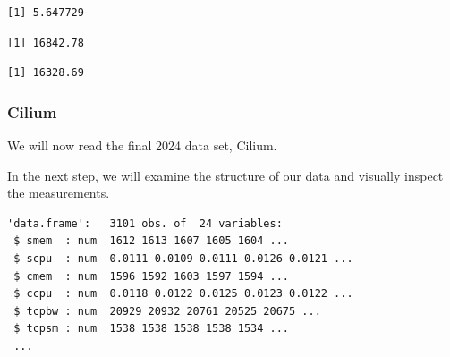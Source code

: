 \begin{verbatim}
[1] 5.647729
\end{verbatim}

\begin{Shaded}
\begin{Highlighting}[]
\SpecialCharTok{\$}
\end{Highlighting}
\end{Shaded}

\begin{verbatim}
[1] 16842.78
\end{verbatim}

\begin{Shaded}
\begin{Highlighting}[]
\SpecialCharTok{\$}
\end{Highlighting}
\end{Shaded}

\begin{verbatim}
[1] 16328.69
\end{verbatim}

\subsubsection{Cilium}

We will now read the final 2024 data set, Cilium.

\begin{Shaded}
\begin{Highlighting}[]
\OtherTok{\textless{}{-}} 
\OtherTok{\textless{}{-}} \NormalTok{(}\NormalTok{,}\NormalTok{))}
\end{Highlighting}
\end{Shaded}

In the next step, we will examine the structure of our data and visually
inspect the measurements.

\begin{Shaded}
\begin{Highlighting}[]
\end{Highlighting}
\end{Shaded}

\begin{verbatim}
'data.frame':   3101 obs. of  24 variables:
 $ smem  : num  1612 1613 1607 1605 1604 ...
 $ scpu  : num  0.0111 0.0109 0.0111 0.0126 0.0121 ...
 $ cmem  : num  1596 1592 1603 1597 1594 ...
 $ ccpu  : num  0.0118 0.0122 0.0125 0.0123 0.0122 ...
 $ tcpbw : num  20929 20932 20761 20525 20675 ...
 $ tcpsm : num  1538 1538 1538 1538 1534 ...
 ...
\end{verbatim}

